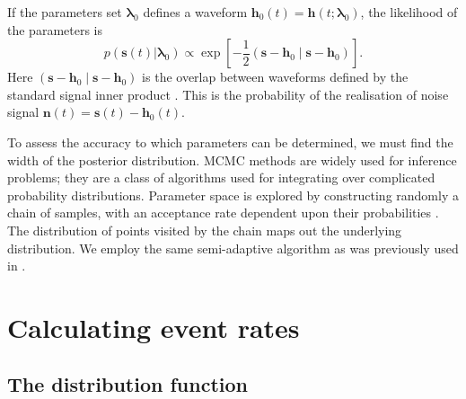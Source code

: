 \documentclass[useAMS,usedcolumn,usegraphicx,usenatbib]{mn2e}
\newcommand{\recip}[1]{\ensuremath{\dfrac{1}{#1}}}
\newcommand{\innerprod}[2]{\ensuremath{\left({#1}\middle|{#2}\right)}}
\begin{document}
If the parameters set $\boldsymbol{\lambda}_0$ defines a waveform $\boldsymbol{h}_0(t) = \boldsymbol{h}(t; \boldsymbol{\lambda}_0)$, the likelihood of the parameters is
\begin{equation}
p(\boldsymbol{s}(t)|\boldsymbol{\lambda}_0) \propto \exp\left[-\recip{2}\innerprod{\boldsymbol{s}-\boldsymbol{h}_0}{\boldsymbol{s}-\boldsymbol{h}_0}\right].
\label{eq:likelihood}
\end{equation}
Here $\innerprod{\boldsymbol{s}-\boldsymbol{h}_0}{\boldsymbol{s}-\boldsymbol{h}_0}$ is the overlap between waveforms defined by the standard signal inner product \citep{Cutler1994}. This is the probability of the realisation of noise signal $\boldsymbol{n}(t) = \boldsymbol{s}(t) - \boldsymbol{h}_0(t)$.

To assess the accuracy to which parameters can be determined, we must find the width of the posterior distribution. MCMC methods are widely used for inference problems; they are a class of algorithms used for integrating over complicated probability distributions. Parameter space is explored by constructing randomly a chain of samples, with an acceptance rate dependent upon their probabilities \citep{Metropolis1953,Hastings1970}. The distribution of points visited by the chain maps out the underlying distribution. We employ the same semi-adaptive algorithm as was previously used in \citet{Berry2012}.

\section{Calculating event rates}

\subsection{The distribution function}
\end{document}
